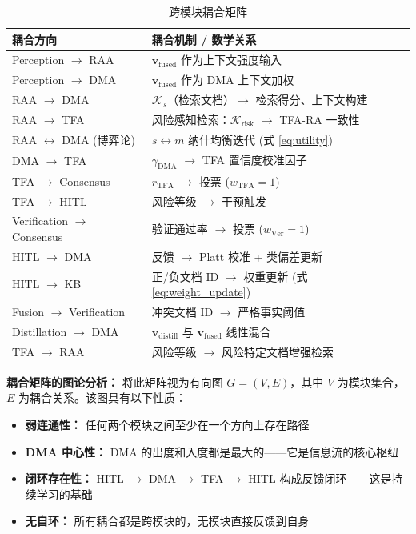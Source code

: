 \documentclass[11pt,a4paper]{ctexart}
\theoremstyle{remark}
\begin{document}
\begin{table}[H]
\centering
\small
\begin{tabular}{lp{6cm}}
\toprule
\textbf{耦合方向} & \textbf{耦合机制 / 数学关系} \\
\midrule
Perception $\to$ RAA & $\mathbf{v}_{\text{fused}}$ 作为上下文强度输入 \\
Perception $\to$ DMA & $\mathbf{v}_{\text{fused}}$ 作为 DMA 上下文加权 \\
RAA $\to$ DMA & $\mathcal{K}_s$（检索文档）$\to$ 检索得分、上下文构建 \\
RAA $\to$ TFA & 风险感知检索：$\mathcal{K}_{\text{risk}}$ $\to$ TFA-RA 一致性 \\
RAA $\leftrightarrow$ DMA (博弈论) & $s \leftrightarrow m$ 纳什均衡迭代 (式 \ref{eq:utility}) \\
DMA $\to$ TFA & $\gamma_{\text{DMA}}$ $\to$ TFA 置信度校准因子 \\
TFA $\to$ Consensus & $r_{\text{TFA}}$ $\to$ 投票 ($w_{\text{TFA}}=1$) \\
TFA $\to$ HITL & 风险等级 $\to$ 干预触发 \\
Verification $\to$ Consensus & 验证通过率 $\to$ 投票 ($w_{\text{Ver}}=1$) \\
HITL $\to$ DMA & 反馈 $\to$ Platt 校准 + 类偏差更新 \\
HITL $\to$ KB & 正/负文档 ID $\to$ 权重更新 (式 \ref{eq:weight_update}) \\
Fusion $\to$ Verification & 冲突文档 ID $\to$ 严格事实阈值 \\
Distillation $\to$ DMA & $\mathbf{v}_{\text{distill}}$ 与 $\mathbf{v}_{\text{fused}}$ 线性混合 \\
TFA $\to$ RAA & 风险等级 $\to$ 风险特定文档增强检索 \\
\bottomrule
\end{tabular}
\caption{跨模块耦合矩阵}
\end{table}

\textbf{耦合矩阵的图论分析：} 将此矩阵视为有向图 $G = (V, E)$，其中 $V$ 为模块集合，
$E$ 为耦合关系。该图具有以下性质：
\begin{itemize}[nosep]
\item \textbf{弱连通性：} 任何两个模块之间至少在一个方向上存在路径
\item \textbf{DMA 中心性：} DMA 的出度和入度都是最大的——它是信息流的核心枢纽
\item \textbf{闭环存在性：} HITL $\to$ DMA $\to$ TFA $\to$ HITL 构成反馈闭环——这是持续学习的基础
\item \textbf{无自环：} 所有耦合都是跨模块的，无模块直接反馈到自身
\end{itemize}
\end{document}
